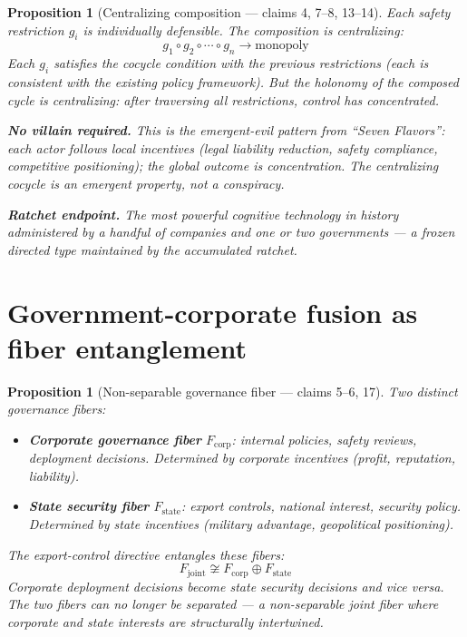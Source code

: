 \documentclass[11pt,a4paper]{article}
\newtheorem{proposition}[definition]{Proposition}
\begin{document}
\begin{proposition}[Centralizing composition --- claims 4, 7--8, 13--14]
\label{prop:ratchet}
Each safety restriction $g_i$ is individually defensible. The composition
is centralizing:
\[
  g_1 \circ g_2 \circ \cdots \circ g_n \to \text{monopoly}
\]
Each $g_i$ satisfies the cocycle condition with the previous restrictions
(each is consistent with the existing policy framework). But the holonomy
of the composed cycle is centralizing: after traversing all restrictions,
control has concentrated.

\textbf{No villain required.} This is the emergent-evil pattern from
``Seven Flavors'': each actor follows local incentives (legal liability
reduction, safety compliance, competitive positioning); the global
outcome is concentration. The centralizing cocycle is an emergent
property, not a conspiracy.

\textbf{Ratchet endpoint.} The most powerful cognitive technology in
history administered by a handful of companies and one or two governments
--- a frozen directed type maintained by the accumulated ratchet.
\end{proposition}

\section{Government-corporate fusion as fiber entanglement}

\begin{proposition}[Non-separable governance fiber --- claims 5--6, 17]
\label{prop:entanglement}
Two distinct governance fibers:
\begin{itemize}
  \item \textbf{Corporate governance fiber} $F_{\text{corp}}$: internal
    policies, safety reviews, deployment decisions. Determined by
    corporate incentives (profit, reputation, liability).
  \item \textbf{State security fiber} $F_{\text{state}}$: export controls,
    national interest, security policy. Determined by state incentives
    (military advantage, geopolitical positioning).
\end{itemize}
The export-control directive entangles these fibers:
\[
  F_{\text{joint}} \not\cong F_{\text{corp}} \oplus F_{\text{state}}
\]
Corporate deployment decisions become state security decisions and vice
versa. The two fibers can no longer be separated --- a non-separable
joint fiber where corporate and state interests are structurally
intertwined.
\end{proposition}
\end{document}
